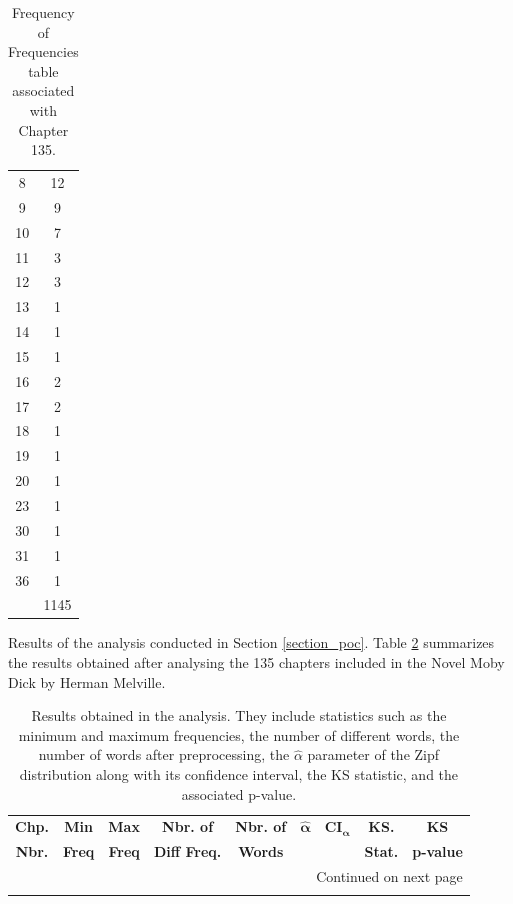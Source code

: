 \documentclass{article}
\begin{document}
\begin{appendices}
\begin{table}[htp!]
\begin{minipage}{0.45\linewidth}
\begin{tabular}{cc}
  8  & 12  \\
  9  & 9   \\
  10 & 7   \\
  11 & 3   \\
  12 & 3   \\
  13 & 1   \\
  14 & 1   \\
  15 & 1   \\
  16 & 2   \\
  17 & 2   \\
  18 & 1   \\
  19 & 1   \\
  20 & 1   \\
  23 & 1   \\
  30 & 1   \\
  31 & 1   \\
  36 & 1   \\
  \hline
& 1145 \\
\hline
\end{tabular}
\caption{Frequency of Frequencies table associated with Chapter 135.}
\label{tab:freq_chapter135}
\end{minipage}
\end{table}

Results of the analysis conducted in Section \ref{section_poc}. Table \ref{tab_results} summarizes the results obtained after analysing the 135 chapters included in the Novel Moby Dick by Herman Melville.

\begin{longtable}{ccccccccc}
\caption{Results obtained in the analysis. They include statistics such as the minimum and maximum frequencies, the number of different words, the number of words after preprocessing, the $\hat{\alpha}$ parameter of the Zipf distribution along with its confidence interval, the KS statistic, and the associated p-value.} \label{tab_results} \\

 \hline
  \textbf{Chp.} & \textbf{Min} & \textbf{Max} & \textbf{Nbr. of} & \textbf{Nbr. of} & $\boldsymbol{\hat{\alpha}}$ & $\boldsymbol{CI_{\alpha}}$ & \textbf{KS.} & \textbf{KS} \\
  \textbf{Nbr.} & \textbf{Freq} & \textbf{Freq} & \textbf{Diff Freq.} & \textbf{Words} & & & \textbf{Stat.} & \textbf{p-value} \\
  \hline
\endhead

\hline
\multicolumn{9}{r}{Continued on next page} \\
\hline
\endfoot


\end{longtable}
\end{appendices}
\end{document}
